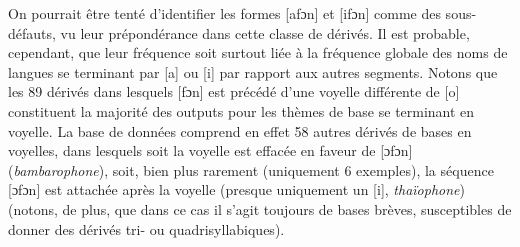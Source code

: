 \documentclass[output=paper]{langsci/langscibook}
\begin{document}
On pourrait être tenté d'identifier les formes {[}afɔn{]} et {[}ifɔn{]}
comme des sous-défauts, vu leur prépondérance dans cette classe de
dérivés. Il est probable, cependant, que leur fréquence soit surtout
liée à la fréquence globale des noms de langues se terminant par {[}a{]}
ou {[}i{]} par rapport aux autres segments. Notons que les 89 dérivés
dans lesquels {[}fɔn{]} est précédé d'une voyelle différente de {[}o{]}
constituent la majorité des outputs pour les thèmes de base se terminant
en voyelle. La base de données comprend en effet 58 autres dérivés de
bases en voyelles, dans lesquels soit la voyelle est effacée en faveur
de {[}ɔfɔn{]} (\emph{bambarophone}), soit, bien plus rarement
(uniquement 6 exemples), la séquence {[}ɔfɔn{]} est attachée après la
voyelle (presque uniquement un {[}i{]}, \emph{thaïophone}) (notons, de
plus, que dans ce cas il s'agit toujours de bases brèves, susceptibles
de donner des dérivés tri- ou quadrisyllabiques).
\end{document}
